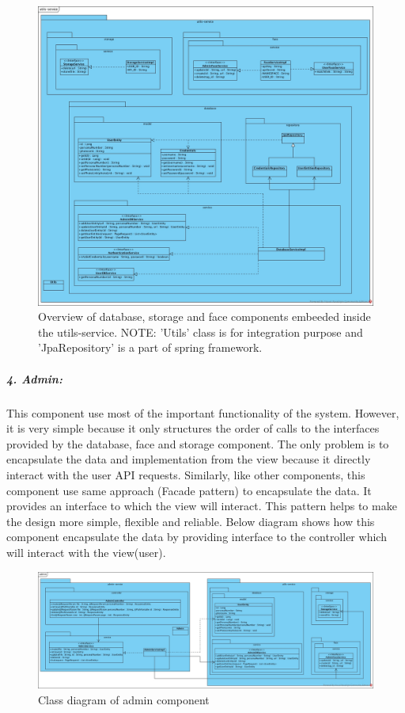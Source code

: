 \documentclass[a4paper,11pt]{article}
\begin{document}
\newpage
\begin{figure}[ht!]
 \centering
    \includegraphics[width=170mm]{ClassDiagrams/new/utils-service.jpg}
    \caption{Overview of database, storage and face components embeeded inside the utils-service.
    \newline
    NOTE: 'Utils' class is for integration purpose and 'JpaRepository' is a part of spring framework.}
\end{figure}

\newpage
\subparagraph{4. Admin: }
This component use most of the important functionality of the system. However, it is very simple because it only structures the order of calls to the interfaces provided by the database, face and storage component. The only problem is to encapsulate the data and implementation from the view because it directly interact with the user API requests. Similarly, like other components, this component use same approach (Facade pattern) to encapsulate the data. It provides an interface to which the view will interact. This pattern helps to make the design more simple, flexible and reliable. Below diagram shows how this component encapsulate the data by providing interface to the controller which will interact with the view(user).

\begin{figure}[ht!]
    \centering
	\includegraphics[width=150mm]{ClassDiagrams/new/admin.jpg}
	\caption{Class diagram of admin component}
\end{figure}
\end{document}
